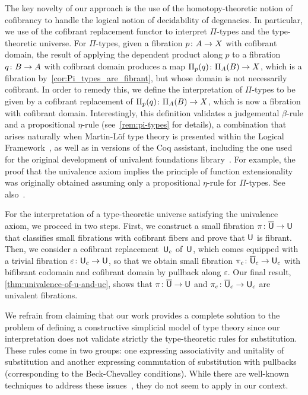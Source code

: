 \documentclass[reqno,10pt,a4paper,oneside,draft]{amsart}
\begin{document}
The key novelty of our approach is the use of the homotopy-theoretic notion of cofibrancy
to handle the logical notion of decidability of degenacies. In particular, we use of the cofibrant  replacement functor
to interpret $\Pi$-types and the type-theoretic universe.  For $\Pi$-types, given a fibration $p \colon A \to X$ with cofibrant domain, the result of applying the dependent product along $p$ to a fibration $q \colon B \to A$ with cofibrant domain produces a map  $\Pi_p(q) \colon \Pi_A(B) \to X$, which is a fibration by~\cref{cor:Pi_types_are_fibrant}, but whose domain
is not necessarily cofibrant. In order to remedy this, we define the interpretation of $\Pi$-types to be given by a cofibrant replacement of
$\Pi_p(q) \colon \Pi_A(B) \to X$, which is now a fibration with cofibrant domain. 
Interestingly, this definition validates 
a judgemental $\beta$-rule and a propositional $\eta$-rule (see~\cref{rem:pi-types} for details), a combination that arises naturally when  Martin-L\"of type theory is presented
within the Logical Framework~\cite{nordstrom-petersson-smith:ml}, as well as in
versions of the Coq assistant, including the one used for the original development of  univalent foundations
library~\cite{voevodsky:library}. For example, the proof that the univalence axiom implies the principle of function extensionality was originally obtained assuming only a propositional $\eta$-rule for $\Pi$-types. See also~\cite{GarnerR:strdp}.

For the interpretation of a  type-theoretic universe satisfying the univalence axiom, we proceed
in two steps. First, we construct a small fibration $\pi \colon \overline{\mathsf{U}} \to \mathsf{U}$ that classifies small fibrations with cofibrant fibers and prove that $\mathsf{U}$ is fibrant. 
Then, we consider a cofibrant replacement~$\mathsf{U}_c$ of~$\mathsf{U}$, which comes equipped with a trivial fibration $\varepsilon \colon \mathsf{U}_c \to \mathsf{U}$, so that 
we obtain small fibration $\pi_c \colon \overline{\mathsf{U}}_c \to \mathsf{U}_c$ with bifibrant codomain and cofibrant domain by pullback along $\varepsilon$. Our final result, \cref{thm:univalence-of-u-and-uc}, shows that
$\pi \colon \overline{\mathsf{U}} \to \mathsf{U}$ and $\pi_c \colon \overline{\mathsf{U}}_c \to \mathsf{U}_c$ are univalent fibrations. 



We refrain from claiming that our work provides a complete solution to the problem of defining a constructive simplicial model of type theory since our interpretation  does not validate strictly the type-theoretic
rules for substitution. These rules come in two groups:
one expressing associativity and unitality of substitution and another expressing commutation of substitution with pullbacks (corresponding to the Beck-Chevalley conditions). While 
there are well-known techniques to address these issues~\cite{voevodsky-simplicial-model,LumsdaineP:locuoc}, they do not seem to apply in our  context.
\end{document}

